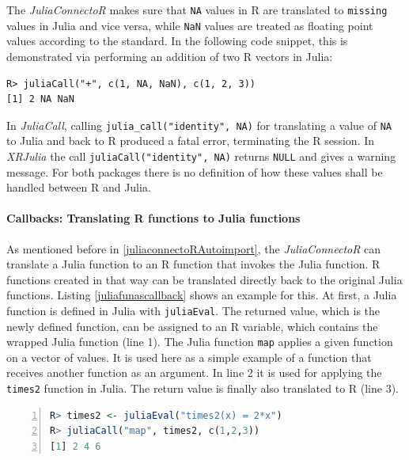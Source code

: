 \documentclass[12pt]{article}
\newcommand{\inlinecode}[1]{\texttt{#1}}
\newcommand{\apkg}[1]{\emph{#1}}
\begin{document}
The \apkg{JuliaConnectoR} makes sure that \inlinecode{NA} values in R are translated to \inlinecode{missing} values in Julia and vice versa, while \inlinecode{NaN} values are treated as floating point values according to the standard.
In the following code snippet, this is demonstrated via performing an addition of two R vectors in Julia:

\begin{lstlisting}
R> juliaCall("+", c(1, NA, NaN), c(1, 2, 3))
[1] 2 NA NaN
\end{lstlisting}


In \apkg{JuliaCall}, calling \inlinecode{julia\_call("identity", NA)} for translating a value of \inlinecode{NA} to Julia and back to R produced a fatal error, terminating the R session.
In \apkg{XRJulia} the call \inlinecode{juliaCall("identity", NA)} returns \inlinecode{NULL} and gives a warning message.
For both packages there is no definition of how these values shall be handled between R and Julia.


\paragraph{Callbacks: Translating R functions to Julia functions}\label{juliaconnectorcallbacks}

As mentioned before in \ref{juliaconnectoRAutoimport}, the \apkg{JuliaConnectoR} can translate a Julia function to an R function that invokes the Julia function.
R functions created in that way can be translated directly back to the original Julia functions.
Listing \ref{juliafunascallback} shows an example for this.
At first, a Julia function is defined in Julia with \inlinecode{juliaEval}.
The returned value, which is the newly defined function, can be assigned to an R variable, which contains the wrapped Julia function (line 1).
The Julia function \inlinecode{map} applies a given function on a vector of values.
It is used here as a simple example of a function that receives another function as an argument.
In line 2 it is used for applying the \inlinecode{times2} function in Julia.
The return value is finally also translated to R (line 3). 

\begin{lstlisting}[language=R, float =!h, caption={Passing a reference to a Julia function back to Julia},label={juliafunascallback}, numbers=left]
R> times2 <- juliaEval("times2(x) = 2*x")
R> juliaCall("map", times2, c(1,2,3))
[1] 2 4 6
\end{lstlisting}
\end{document}
